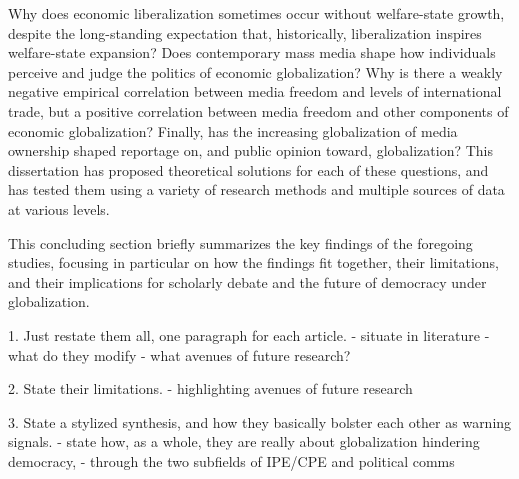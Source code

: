 \documentclass[12pt]{report}
\begin{document}
Why does economic liberalization sometimes occur without welfare-state growth, despite the long-standing expectation that, historically, liberalization inspires welfare-state expansion? Does contemporary mass media shape how individuals perceive and judge the politics of economic globalization?  Why is there a weakly negative empirical correlation between media freedom and levels of international trade, but a positive correlation between media freedom and other components of economic globalization? Finally, has the increasing globalization of media ownership shaped reportage on, and public opinion toward, globalization? This dissertation has proposed theoretical solutions for each of these questions, and has tested them using a variety of research methods and multiple sources of data at various levels.

This concluding section briefly summarizes the key findings of the foregoing studies, focusing in particular on how the findings fit together, their limitations, and their implications for scholarly debate and the future of democracy under globalization.

1. Just restate them all, one paragraph for each article.
	- situate in literature
	- what do they modify
	- what avenues of future research?

2. State their limitations.
	- highlighting avenues of future research

3. State a stylized synthesis, and how they basically bolster each other as warning signals.
	- state how, as a whole, they are really about globalization hindering democracy,
	- through the two subfields of IPE/CPE and political comms







\end{document}
